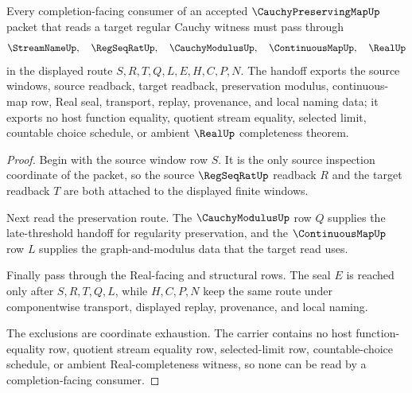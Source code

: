 \begin{theorem}
\label{thm:cauchy-preserving-map-regular-sequence-handoff}
Every completion-facing consumer of an accepted $\CauchyPreservingMapUp$ packet that reads a target regular Cauchy witness must pass through
$$
\StreamNameUp,\quad \RegSeqRatUp,\quad \CauchyModulusUp,\quad \ContinuousMapUp,\quad \RealUp
$$
in the displayed route $S,R,T,Q,L,E,H,C,P,N$. The handoff exports the source windows, source readback, target readback, preservation modulus, continuous-map row, Real seal, transport, replay, provenance, and local naming data; it exports no host function equality, quotient stream equality, selected limit, countable choice schedule, or ambient $\RealUp$ completeness theorem.
\end{theorem}
\begin{proof}
Begin with the source window row $S$. It is the only source inspection coordinate of the packet, so the source $\RegSeqRatUp$ readback $R$ and the target readback $T$ are both attached to the displayed finite windows.

Next read the preservation route. The $\CauchyModulusUp$ row $Q$ supplies the late-threshold handoff for regularity preservation, and the $\ContinuousMapUp$ row $L$ supplies the graph-and-modulus data that the target read uses.

Finally pass through the Real-facing and structural rows. The seal $E$ is reached only after $S,R,T,Q,L$, while $H,C,P,N$ keep the same route under componentwise transport, displayed replay, provenance, and local naming.

The exclusions are coordinate exhaustion. The carrier contains no host function-equality row, quotient stream equality row, selected-limit row, countable-choice schedule, or ambient Real-completeness witness, so none can be read by a completion-facing consumer.
\end{proof}


